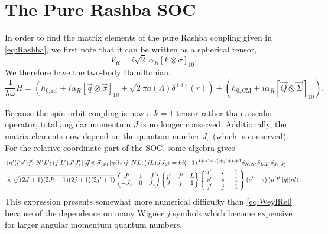 \documentclass[%
 preprint,
 amsmath,amssymb,
 aps,
]{revtex4-1}
\newcommand{\threej}[6]{ \begin{pmatrix}
  #1 & #2 & #3 \\
  #4 & #5 & #6 
 \end{pmatrix}}
\newcommand{\sixj}[6]{ \begin{Bmatrix}
  #1 & #2 & #3 \\
  #4 & #5 & #6 
 \end{Bmatrix}}
\newcommand{\ninej}[9]{ \begin{Bmatrix}
  #1 & #2 & #3 \\
  #4 & #5 & #6 \\
  #7 & #8 & #9
 \end{Bmatrix}}
\begin{document}
\section{\label{sec:Rashba}The Pure Rashba SOC}

In order to find the matrix elements of the pure Rashba coupling given in \eqref{eq:Rashba}, we first note that it can be written as a spherical tensor,
\begin{equation}
V_{R}=i\sqrt{2}\:\alpha_R \left[ k \otimes \sigma \right]_{10}.
\end{equation}
We therefore have the two-body Hamiltonian,
\begin{equation}\label{eq:RashbaHamiltonian}
\frac{1}{\hbar\omega}H=\left(h_{0,\text{rel}}+i \tilde{\alpha}_R  \left[ \vec{q} \otimes \vec{\sigma} \right]_{10} + \sqrt{2}\pi \tilde{a}(\Lambda) \delta^{(3)}(r)\right)+\left(h_{0,\text{CM}}+i \tilde{\alpha}_R [ \vec{Q}\otimes \vec{\Sigma} ]_{10} \right).
\end{equation}

Because the spin orbit coupling is now a $k=1$ tensor rather than a scalar operator, total angular momentum $J$ is no longer conserved. Additionally, the matrix elements now depend on the quantum number $J_z$ (which is conserved). For the relative coordinate part of the SOC, some algebra gives
\begin{equation}\begin{split}
&\bra{n'(l's')j';N'L';(j'L')J'J'_z}  [ \vec{q} \otimes \vec{\sigma} ]_{10}  \ket{n(ls)j;NL;(jL)JJ_z} =6 i (-1)^{J+J'-J'_z+j'+L+1}\delta_{N,N'}\delta_{L,L'}\delta_{J_z,J'_z} \\
 &\times\sqrt{(2J+1)(2J'+1)(2j+1)(2j'+1)} \threej{J'}{1}{J}{-J_z}{0}{J_z} \sixj{j'}{J'}{L}{J}{j}{1}
 \renewcommand{\arraystretch}{0.9}
 \ninej{\hphantom{l}l'\hphantom{l}}{\hphantom{l}l\hphantom{l}}{\hphantom{l}1\hphantom{l}}{s'}{s}{1}{j'}{j}{1} (s'-s) \braket{n'l' || q || n l},
\end{split}
\end{equation}
This expression presents somewhat more numerical difficulty than \eqref{eq:WeylRel} because of the dependence on many Wigner $j$ symbols which become expensive for larger angular momentum quantum numbers.
\end{document}
